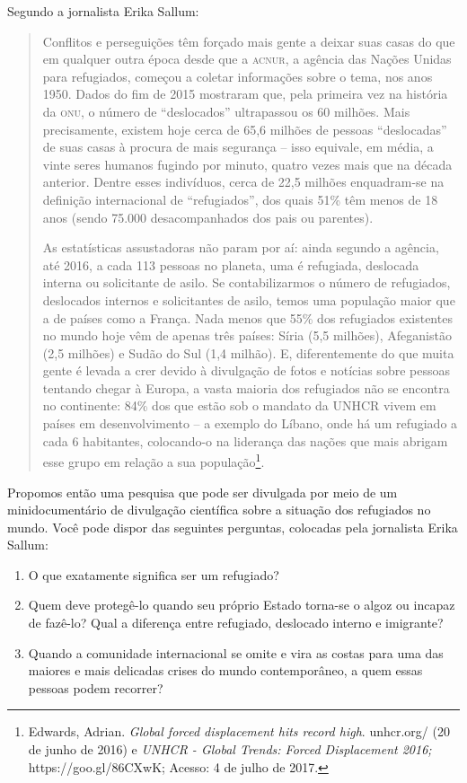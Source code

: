 \documentclass[12pt]{extarticle}
\begin{document}
Segundo a jornalista Erika Sallum:

\begin{quote}
Conflitos e perseguições têm forçado mais gente a deixar suas casas do
que em qualquer outra época desde que a \textsc{acnur}, a agência das Nações
Unidas para refugiados, começou a coletar informações sobre o tema, nos
anos 1950. Dados do fim de 2015 mostraram que, pela primeira vez na
história da \textsc{onu}, o número de ``deslocados'' ultrapassou os 60 milhões.
Mais precisamente, existem hoje cerca de 65,6 milhões de pessoas
``deslocadas'' de suas casas à procura de mais segurança -- isso
equivale, em média, a vinte seres humanos fugindo por minuto, quatro vezes
mais que na década anterior. Dentre esses indivíduos, cerca de 22,5 
milhões enquadram-se na definição internacional de ``refugiados'', dos
quais 51\% têm menos de 18 anos (sendo 75.000 desacompanhados dos pais
ou parentes).

As estatísticas assustadoras não param por aí: ainda segundo a agência,
até 2016, a cada 113 pessoas no planeta, uma é refugiada, deslocada
interna ou solicitante de asilo. Se contabilizarmos o número de
refugiados, deslocados internos e solicitantes de asilo, temos uma
população maior que a de países como a França. Nada menos que 55\% dos
refugiados existentes no mundo hoje vêm de apenas três países: Síria (5,5 milhões),
Afeganistão (2,5 milhões) e Sudão do Sul (1,4 milhão). E, diferentemente do que muita gente é levada a
crer devido à divulgação de fotos e notícias sobre pessoas tentando
chegar à Europa, a vasta maioria dos refugiados não se encontra no
continente: 84\% dos que estão sob o mandato da {UNHCR} vivem em países em
desenvolvimento -- a exemplo do Líbano, onde há um refugiado a cada 6
habitantes, colocando-o na liderança das nações que mais abrigam esse
grupo em relação a sua população\footnote{Edwards, Adrian. \emph{Global forced
  displacement hits record high}.
  {unhcr.org/} (20 de
  junho de 2016) e \emph{{UNHCR} - Global Trends: Forced Displacement 2016;}
  https://goo.gl/86CXwK; Acesso: 4 
  de julho de 2017.}. 
\end{quote}

Propomos então uma pesquisa que pode ser divulgada por meio de
um minidocumentário de divulgação científica sobre a situação dos refugiados 
no mundo. Você pode dispor das seguintes perguntas, colocadas pela 
jornalista Erika Sallum:

\begin{enumerate}
\item O que exatamente significa ser um refugiado? 
\item Quem deve protegê-lo quando seu próprio Estado torna-se o algoz 
ou incapaz de fazê-lo? Qual a
diferença entre refugiado, deslocado interno e imigrante? 
\item Quando a comunidade internacional se omite e vira as
costas para uma das maiores e mais delicadas crises do mundo contemporâneo, a
quem essas pessoas podem recorrer?
\end{enumerate}
\end{document}
